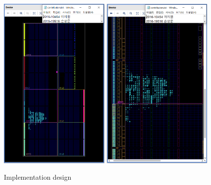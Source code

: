 \documentclass{article}
\begin{document}
\begin{figure}[ht]
	\centering
	\includegraphics[width=0.49\textwidth]{fig/My_PE_Controller_Design1.png}
	\includegraphics[width=0.49\textwidth]{fig/My_PE_Controller_Design2.png}
\caption{Implementation design}
\label{fig3}
\end{figure}
\end{document}
